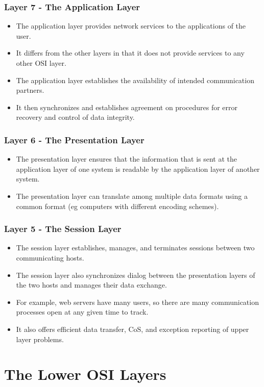 \documentclass[pdflatex,compress]{beamer}
\begin{document}
\begin{frame}
	\frametitle{Layer 7 - The Application Layer}
	\begin{itemize}
		\item The application layer provides network services to the applications of the user.
		\item It differs from the other layers in that it does not provide services to any other OSI layer.
		\item The application layer establishes the availability of intended communication partners.
		\item It then synchronizes and establishes agreement on procedures for error recovery and control of data integrity.
	\end{itemize}
\end{frame}

\begin{frame}
	\frametitle{Layer 6 - The Presentation Layer}
	\begin{itemize}
		\item The presentation layer ensures that the information that is sent at the application layer of one system is readable by the application layer of another system.
		\item The presentation layer can translate among multiple data formats using a common format (eg computers with different encoding schemes).
	\end{itemize}
\end{frame}

\begin{frame}
	\frametitle{Layer 5 - The Session Layer}
	\begin{itemize}
		\item The session layer establishes, manages, and terminates sessions between two communicating hosts.
		\item The session layer also synchronizes dialog between the presentation layers of the two hosts and manages their data exchange.
		\item For example, web servers have many users, so there are many communication processes open at any given time to track.
		\item It also offers efficient data transfer, CoS, and exception reporting of upper layer problems.
	\end{itemize}
\end{frame}

\section{The Lower OSI Layers}
\end{document}
